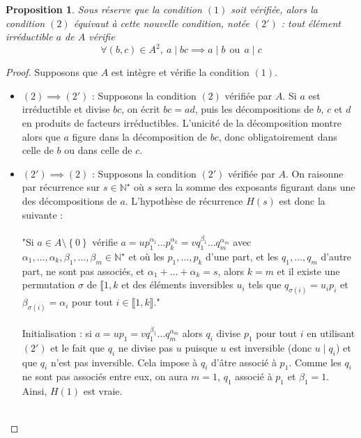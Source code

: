 \documentclass[french]{book}
\newcommand{\N}{\mathbb{N}}
\newcommand{\st}{^\star}
\theoremstyle{plain}
\newtheorem{prop}{Proposition}[chapter]
\theoremstyle{definition}
\theoremstyle{remark}
\begin{document}
\begin{prop}
	Sous réserve que la condition $(1)$ soit vérifiée, alors la condition $(2)$ équivaut à cette nouvelle condition, notée $(2')$ : tout élément irréductible $a$ de $A$ vérifie $$\forall(b,c)\in A^2,\ a\mid bc\implies a\mid b\ \ \text{ou}\ \ a\mid c$$
\end{prop}
\begin{proof}
	Supposons que $A$ est intègre et vérifie la condition $(1)$.
	\begin{itemize}
		\item $(2)\implies(2')$ : Supposons la condition $(2)$ vérifiée par $A$. Si $a$ est irréductible et divise $bc$, on écrit $bc=ad$, puis les décompositions de $b$, $c$ et $d$ en produits de facteurs irréductibles. L'unicité de la décomposition montre alors que $a$ figure dans la décomposition de $bc$, donc obligatoirement dans celle de $b$ ou dans celle de $c$.
		\item $(2')\implies(2)$ : Supposons la condition $(2')$ vérifiée par $A$. On raisonne par récurrence sur $s\in\N\st$ où $s$ sera la somme des exposants figurant dans une des décompositions de $a$. L'hypothèse de récurrence $H(s)$ est donc la suivante : \\ \\ "Si $a\in A\setminus\left\{0\right\}$ vérifie $a=up_1^{\alpha_1}\ldots p_k^{\alpha_k}=vq_1^{\beta_1}\ldots q_m^{\alpha_m}$ avec $\alpha_1,\ldots,\alpha_k,\beta_1,\ldots,\beta_m\in\N\st$ et où les $p_1,\ldots,p_k$ d'une part, et les $q_1,\ldots,q_m$ d'autre part, ne sont pas associés, et $\alpha_1+\ldots+\alpha_k=s$, alors $k=m$ et il existe une permutation $\sigma$ de $\llbracket1,k$ et des éléments inversibles $u_i$ tels que $q_{\sigma(i)}=u_ip_i$ et $\beta_{\sigma(i)}=\alpha_i$ pour tout $i\in\llbracket1,k\rrbracket$." \\ \\ Initialisation : si $a=up_1=vq_1^{\beta_1}\ldots q_m^{\alpha_m}$ alors $q_i$ divise $p_1$ pour tout $i$ en utilisant $(2')$ et le fait que $q_i$ ne divise pas $u$ puisque $u$ est inversible (donc $u\mid q_i$) et que $q_i$ n'est pas inversible. Cela impose à $q_i$ d'âtre associé à $p_1$. Comme les $q_i$ ne sont pas associés entre eux, on aura $m=1$, $q_1$ associé à $p_1$ et $\beta_1=1$. Ainsi, $H(1)$ est vraie.\\ \\

\end{itemize}
\end{proof}
\end{document}
